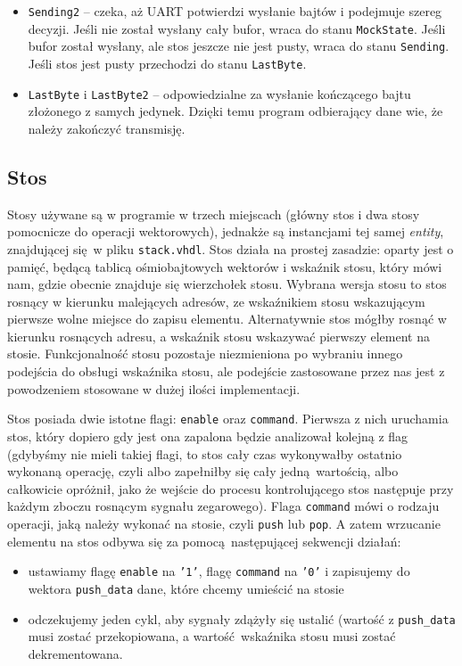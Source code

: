 \begin{itemize}
  \item \texttt{Sending2} -- czeka, aż UART potwierdzi wysłanie bajtów i podejmuje szereg decyzji. Jeśli nie został wysłany cały bufor, wraca do stanu \texttt{MockState}. Jeśli bufor został wysłany, ale stos jeszcze nie jest pusty, wraca do stanu \texttt{Sending}. Jeśli stos jest pusty przechodzi do stanu \texttt{LastByte}.
  \item \texttt{LastByte} i \texttt{LastByte2} -- odpowiedzialne za wysłanie kończącego bajtu złożonego z samych jedynek. Dzięki temu program odbierający dane wie, że należy zakończyć transmisję.
\end{itemize}

\subsection{Stos}

Stosy używane są w programie w trzech miejscach (główny stos i dwa stosy pomocnicze do operacji wektorowych), jednakże są instancjami tej samej \textit{entity}, znajdującej się w pliku \texttt{stack.vhdl}. Stos działa na prostej zasadzie: oparty jest o pamięć, będącą tablicą ośmiobajtowych wektorów i wskaźnik stosu, który mówi nam, gdzie obecnie znajduje się wierzchołek stosu. Wybrana wersja stosu to stos rosnący w kierunku malejących adresów, ze wskaźnikiem stosu wskazującym pierwsze wolne miejsce do zapisu elementu. Alternatywnie stos mógłby rosnąć w kierunku rosnących adresu, a wskaźnik stosu wskazywać pierwszy element na stosie. Funkcjonalność stosu pozostaje niezmieniona po wybraniu innego podejścia do obsługi wskaźnika stosu, ale podejście zastosowane przez nas jest z powodzeniem stosowane w dużej ilości implementacji.

Stos posiada dwie istotne flagi: \texttt{enable} oraz \texttt{command}. Pierwsza z nich uruchamia stos, który dopiero gdy jest ona zapalona będzie analizował kolejną z flag (gdybyśmy nie mieli takiej flagi, to stos cały czas wykonywałby ostatnio wykonaną operację, czyli albo zapełniłby się cały jedną wartością, albo całkowicie opróżnił, jako że wejście do procesu kontrolującego stos następuje przy każdym zboczu rosnącym sygnału zegarowego). Flaga \texttt{command} mówi o rodzaju operacji, jaką należy wykonać na stosie, czyli \texttt{push} lub \texttt{pop}. A zatem wrzucanie elementu na stos odbywa się za pomocą następującej sekwencji działań:

\begin{itemize}
  \item ustawiamy flagę \texttt{enable} na \texttt{'1'}, flagę \texttt{command} na \texttt{'0'} i zapisujemy do wektora \texttt{push\_data} dane, które chcemy umieścić na stosie
  \item odczekujemy jeden cykl, aby sygnały zdążyły się ustalić (wartość z \texttt{push\_data} musi zostać przekopiowana, a wartość wskaźnika stosu musi zostać dekrementowana.
\end{itemize}

